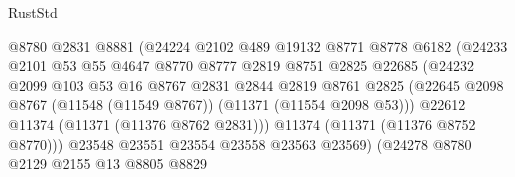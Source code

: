 \begin{lexlean}{RustStd}
\begin{coremodule}
                                    @8780
                                    @2831
                                    @8881
                                    (@24224
                                      @2102
                                      @489
                                      @19132
                                      @8771
                                      @8778
                                      @6182
                                      (@24233
                                        @2101
                                        @53
                                        @55
                                        @4647
                                        @8770
                                        @8777
                                        @2819
                                        @8751
                                        @2825
                                        @22685
                                        (@24232
                                          @2099
                                          @103
                                          @53
                                          @16
                                          @8767
                                          @2831
                                          @2844
                                          @2819
                                          @8761
                                          @2825
                                          (@22645
                                            @2098
                                            @8767
                                            (@11548 (@11549 @8767))
                                            (@11371 (@11554 @2098 @53)))
                                          @22612
                                          @11374
                                          (@11371 (@11376 @8762 @2831)))
                                        @11374
                                        (@11371 (@11376 @8752 @8770)))
                                      @23548
                                      @23551
                                      @23554
                                      @23558
                                      @23563
                                      @23569)
                                    (@24278
                                      @8780
                                      @2129
                                      @2155
                                      @13
                                      @8805
                                      @8829

\end{coremodule}
\end{lexlean}
